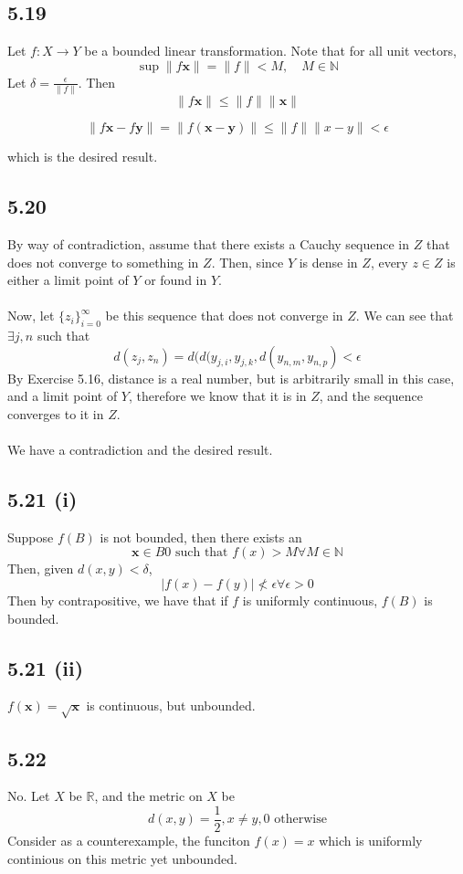 \documentclass[letterpaper,12pt]{article}
\theoremstyle{definition}
\begin{document}
\subsection*{5.19}

Let $f: X \to Y$ be a bounded linear transformation. Note that for all unit vectors, 
\[\sup \|f \mathbf{x}\| = \|f\| < M, \quad M \in \mathbb{N}\]
Let $\delta = \frac{\epsilon}{\|f\|} $. Then
\[\|f \mathbf{x} \| \leq \|f\| \|\mathbf{x}\|\]
 
\[\|f \mathbf{x} - f\mathbf{y} \| = \|f(\mathbf{x}- \mathbf{y})\| \leq \|f\|\|x-y\| < \epsilon\]

which is the desired result.

\subsection*{5.20}


By way of contradiction, assume that there exists a Cauchy sequence in $Z$ that does not converge to something in $Z$. Then, since $Y$ is dense in $Z$, every $z \in Z$ is either a limit point of $Y$ or found in $Y$. \\\\
Now, let $\{z_i\}_{i=0}^\infty$ be this sequence that does not converge in $Z$. We can see that $\exists j,n$ such that
\[
d(z_j,z_n) = d(d(y_{j,i},y_{j,k},d(y_{n,m},y_{n,p})<\epsilon
\]
By Exercise 5.16, distance is a real number, but is arbitrarily small in this case, and a limit point of $Y$, therefore we know that it is in $Z$, and the sequence converges to it in $Z$.\\\\
We have a contradiction and the desired result.



\subsection*{5.21 (i)}


        Suppose $f(B)$ is not bounded, then there exists an 
        \[\mathbf{x} \in B0 \text{ such that } f(x) > M \forall M \in \mathbb{N}\] Then, given $d(x,y) < \delta$, 
        \[|f(x)-f(y)| \not < \epsilon \forall \epsilon > 0\] 
        Then by contrapositive, we have that if $f$ is uniformly continuous, $f(B)$ is bounded.
\subsection*{5.21 (ii)}
    $f(\mathbf{x}) = \sqrt{\mathbf{x}}$ is continuous, but unbounded.

\subsection*{5.22}
    
    
No. Let $X$ be $\mathbb{R}$, and the metric on $X$ be 
\[d(x,y) = \frac{1}{2}, x \neq y, 0 \text{ otherwise}\] 
Consider as a counterexample, the funciton $f(x) = x$ which is uniformly continious on this metric yet unbounded.
\end{document}
